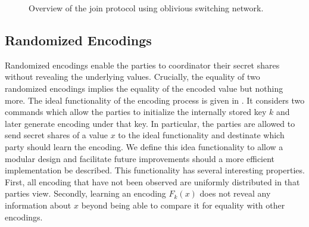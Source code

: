 \begin{figure}\centering
	\caption{Overview of the join protocol using oblivious switching network.}
\end{figure}

\subsection{Randomized Encodings}

Randomized encodings enable the parties to coordinator their secret shares without revealing the underlying values. Crucially, the equality  of two randomized encodings implies the equality of the encoded value but nothing more. The ideal functionality of the encoding process is given in . It considers two commands which allow the parties to initialize the internally stored key $k$ and later generate encoding under that key. In particular, the parties are allowed to send secret shares of a value $x$  to the ideal functionality and destinate which party should learn the encoding.  We define this idea functionality to allow a modular design and facilitate future improvements should a more efficient implementation be described. This functionality has several interesting properties. First, all encoding that have not been observed are uniformly distributed in that parties view. Secondly, learning an encoding $F_k(x)$ does not reveal any information about $x$ beyond being able to compare it for equality with other encodings.

